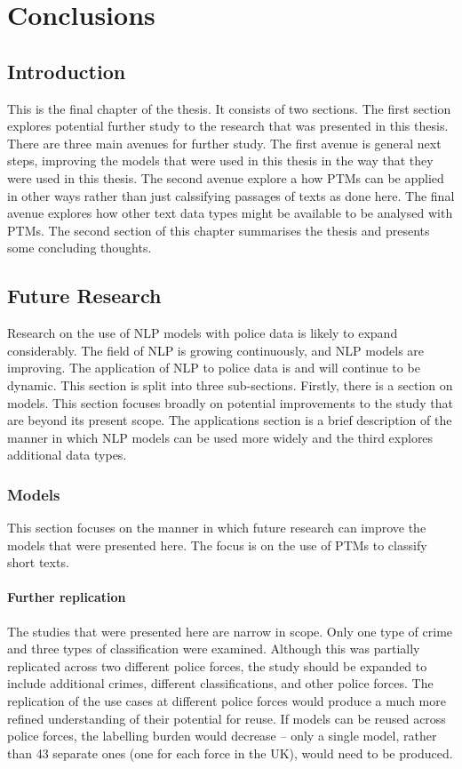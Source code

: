 \chapter{Conclusions}

\section{Introduction} This is the final chapter of the thesis. It consists of two sections. The first section explores potential further study to the research that was presented in this thesis. There are three main avenues for further study. The first avenue is general next steps, improving the models that were used in this thesis in the way that they were used in this thesis. The second avenue explore a how PTMs can be applied in other ways rather than just calssifying passages of texts as done here. The final avenue explores how other text data types might be available to be analysed with PTMs. The second section of this chapter summarises the thesis and presents some concluding thoughts.

\section{Future Research} Research on the use of NLP models with police data is likely to expand considerably. The field of NLP is growing continuously, and NLP models are improving. The application of NLP to police data is and will continue to be dynamic. This section is split into three sub-sections. Firstly, there is a section on models. This section focuses broadly on potential improvements to the study that are beyond its present scope. The applications section is a brief description of the manner in which NLP models can be used more widely and the third explores additional data types.

\subsection{Models} This section focuses on the manner in which future research can improve the models that were presented here. The focus is on the use of PTMs to classify short texts.

\subsubsection{Further replication} The studies that were presented here are narrow in scope. Only one type of crime and three types of classification were examined. Although this was partially replicated across two different police forces, the study should be expanded to include additional crimes, different classifications, and other police forces. The replication of the use cases at different police forces would produce a much more refined understanding of their potential for reuse. If models can be reused across police forces, the labelling burden would decrease – only a single model, rather than 43 separate ones (one for each force in the UK), would need to be produced. 

